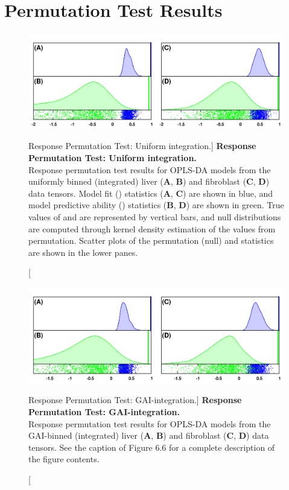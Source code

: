 \section{Permutation Test Results}

\begin{figure}[ht!]
\includegraphics[width=6.5in]{figs/gaibin/06.png}
\caption
      [Response Permutation Test: Uniform integration.]{
  {\bf Response Permutation Test: Uniform integration.}
  \\
  Response permutation test results for OPLS-DA models from the uniformly
  binned (integrated) liver ({\bf A}, {\bf B}) and fibroblast
  ({\bf C}, {\bf D}) data tensors. Model fit (\rsqy) statistics
  ({\bf A}, {\bf C}) are shown in blue, and model predictive ability (\qsq)
  statistics ({\bf B}, {\bf D}) are shown in green. True values of \rsqy and
  \qsq are represented by vertical bars, and null distributions are computed
  through kernel density estimation of the values from permutation. Scatter
  plots of the permutation (null) \rsqy and \qsq statistics are shown in the
  lower panes.
}
\end{figure}

\begin{figure}[ht!]
\includegraphics[width=6.5in]{figs/gaibin/07.png}
\caption
      [Response Permutation Test: GAI-integration.]{
  {\bf Response Permutation Test: GAI-integration.}
  \\
  Response permutation test results for OPLS-DA models from the GAI-binned
  (integrated) liver ({\bf A}, {\bf B}) and fibroblast
  ({\bf C}, {\bf D}) data tensors. See the caption of Figure 6.6 for a
  complete description of the figure contents.
}
\end{figure}

